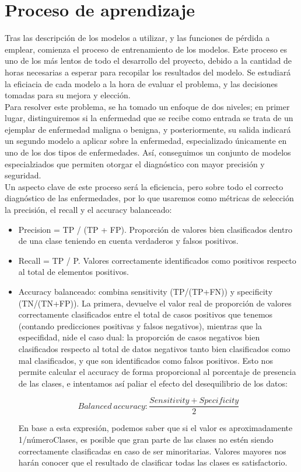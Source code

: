 \chapter{Proceso de aprendizaje}

Tras las descripción de los modelos a utilizar, y las funciones de pérdida a emplear, comienza el proceso de entrenamiento de los modelos. Este proceso es uno de los más lentos de todo el desarrollo del proyecto, debido a la cantidad de horas necesarias a esperar para recopilar los resultados del modelo. Se estudiará la eficiacia de cada modelo a la hora de evaluar el problema, y las decisiones tomadas para su mejora y elección.\\

Para resolver este problema, se ha tomado un enfoque de dos niveles; en primer lugar, distinguiremos si la enfermedad que se recibe como entrada se trata de un ejemplar de enfermedad maligna o benigna, y posteriormente, su salida indicará un segundo modelo a aplicar sobre la enfermedad, especializado únicamente en uno de los dos tipos de enfermedades. Así, conseguimos un conjunto de modelos especialziados que permiten otorgar el diagnóstico con mayor precisión y seguridad.\\

Un aspecto clave de este proceso será la eficiencia, pero sobre todo el correcto diagnóstico de las enfermedades, por lo que usaremos como métricas de selección la precisión, el recall y el accuracy balanceado:

\begin{itemize}
	\item Precision = TP / (TP + FP). Proporción de valores bien clasificados dentro de una clase teniendo en cuenta verdaderos y falsos positivos.
	\item Recall = TP / P. Valores correctamente identificados como positivos respecto al total de elementos positivos.
	\item Accuracy balanceado: combina sensitivity (TP/(TP+FN)) y specificity (TN/(TN+FP)). La primera, devuelve el valor real de proporción de valores correctamente clasificados entre el total de casos positivos que tenemos (contando predicciones positivas y falsos negativos), mientras que la especifidad, nide el caso dual: la proporción de casos negativos bien clasificados respecto al total de datos negativos tanto bien clasificados como mal clasificados, y que son identificados como falsos positivos. Esto nos permite calcular el accuracy de forma proporcional al porcentaje de presencia de las clases, e intentamos así paliar el efecto del desequilibrio de los datos:
	
$$ Balanced\ accuracy: \frac{Sensitivity + Specificity}{2}$$
	
	En base a esta expresión, podemos saber que si el valor es aproximadamente 1/númeroClases, es posible que gran parte de las clases no estén siendo correctamente clasificadas en caso de ser minoritarias. Valores mayores nos harán conocer que el resultado de clasificar todas las clases es satisfactorio.
\end{itemize}

